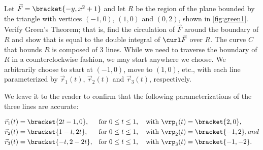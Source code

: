 \begin{example}\label{ex_green1}
%
%
Let $\vec F =\bracket{-y,x^2+1}$ and let $R$ be the region of the plane bounded by the triangle with vertices $(-1,0)$, $(1,0)$ and $(0,2)$, shown in \autoref{fig:green1}. Verify Green's Theorem; that is, find the circulation of $\vec F$ around the boundary of $R$ and show that is equal to the double integral of $\curl \vec F$ over $R$.
\solution
The curve $C$ that bounds $R$ is composed of 3 lines. While we need to traverse the boundary of $R$ in a counterclockwise fashion, we may start anywhere we choose. We arbitrarily choose to start at $(-1,0)$, move to $(1,0)$, etc., with each line parameterized by $\vec r_1(t)$, $\vec r_2(t)$ and $\vec r_3(t)$, respectively.

We leave it to the reader to confirm that the following parameterizations of the three lines are accurate:

\begin{align*}
\vec r_1(t) &=\bracket{2t-1,0}, && \text{for }0\leq t\leq 1,\quad\text{with }\vrp_1(t) =\bracket{ 2,0},\\
\vec r_2(t) &=\bracket{1-t,2t}, && \text{for }0\leq t\leq 1,\quad\text{with }\vrp_2(t) =\bracket{ -1,2}, and\\
\vec r_3(t) &=\bracket{-t,2-2t}, && \text{for }0\leq t\leq 1,\quad\text{with } \vrp_3(t) =\bracket{ -1,-2}.
\end{align*}


\end{example}
